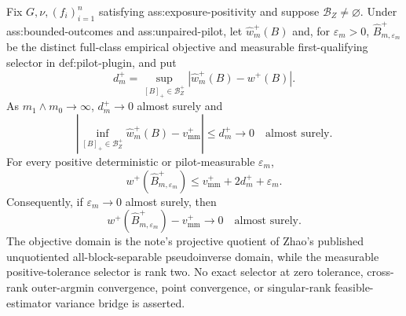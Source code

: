 Fix \(G,\nu,(f_i)_{i=1}^n\) satisfying ass:exposure-positivity and suppose \(\mathcal B_Z\ne\varnothing\).  Under ass:bounded-outcomes and ass:unpaired-pilot, let \(\widehat w_m^+(B)\) and, for \(\varepsilon_m>0\), \(\widehat B_{m,\varepsilon_m}^+\) be the distinct full-class empirical objective and measurable first-qualifying selector in def:pilot-plugin, and put
\[
d_m^+=\sup_{[B]_+\in\mathcal B_Z^+}|\widehat w_m^+(B)-w^+(B)|.
\]
As \(m_1\wedge m_0\to\infty\), \(d_m^+\to0\) almost surely and
\[
\left|\inf_{[B]_+\in\mathcal B_Z^+}\widehat w_m^+(B)-v_{\mathrm{mm}}^+\right|
\le d_m^+\longrightarrow0
\quad\text{almost surely}.
\]
For every positive deterministic or pilot-measurable \(\varepsilon_m\),
\[
w^+(\widehat B_{m,\varepsilon_m}^+)
\le v_{\mathrm{mm}}^++2d_m^++\varepsilon_m.
\]
Consequently, if \(\varepsilon_m\to0\) almost surely, then
\[
w^+(\widehat B_{m,\varepsilon_m}^+)-v_{\mathrm{mm}}^+\longrightarrow0
\quad\text{almost surely}.
\]
The objective domain is the note's projective quotient of Zhao's published unquotiented all-block-separable pseudoinverse domain, while the measurable positive-tolerance selector is rank two.  No exact selector at zero tolerance, cross-rank outer-argmin convergence, point convergence, or singular-rank feasible-estimator variance bridge is asserted.